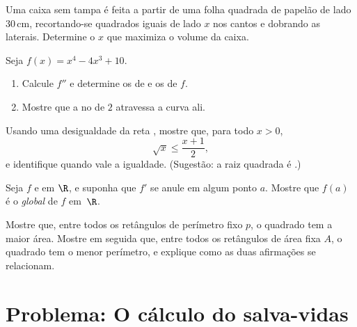\begin{exercise}[$\star\star$]\label{exo:g12:deriv:5}
Uma caixa sem tampa é feita a partir de uma folha quadrada de papelão de
lado $30\,$cm, recortando-se quadrados iguais de lado $x$ nos cantos e
dobrando as laterais. Determine o $x$ que maximiza o volume da caixa.
\end{exercise}

\begin{exercise}[$\star\star$]\label{exo:g12:deriv:6}
Seja $f(x) = x^4 - 4x^3 + 10$.
\begin{enumerate}
  \item Calcule $f''$ e determine os  de  e os  de $f$.
  \item Mostre que a  no  de  $2$
        atravessa a curva ali.
\end{enumerate}
\end{exercise}

\begin{exercise}[$\star\star$]\label{exo:g12:deriv:7}
Usando uma desigualdade da reta , mostre que, para todo $x > 0$,
\[
\sqrt{x} \leq \frac{x + 1}{2},
\]
e identifique quando vale a igualdade. (Sugestão: a raiz quadrada é
.)
\end{exercise}

\begin{exercise}[$\star\star\star$]\label{exo:g12:deriv:8}
Seja $f$  e  em $\R$, e suponha que $f'$ se anule em algum
ponto $a$. Mostre que $f(a)$ é o  \emph{global} de $f$ em~$\R$.
\end{exercise}

\begin{exercise}[$\star\star\star$]\label{exo:g12:deriv:9}
Mostre que, entre todos os retângulos de perímetro fixo $p$, o quadrado
tem a maior área. Mostre em seguida que, entre todos os retângulos de área
fixa $A$, o quadrado tem o menor perímetro, e explique como as duas
afirmações se relacionam.
\end{exercise}

\section{Problema: O cálculo do salva-vidas}

